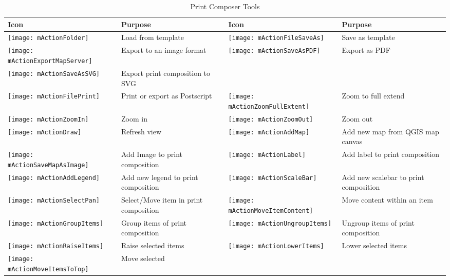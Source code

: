\begin{table}[h]
\centering
\caption{Print Composer Tools}\label{tab:printcomposer_tools}\medskip
 \begin{tabular}{|l|p{6.9cm}|l|p{6.9cm}|}
 \hline \textbf{Icon} & \textbf{Purpose} & \textbf{Icon} &
 \textbf{Purpose} \\
 \hline \texttt{[image: mActionFolder]}
 & Load from template &
 \texttt{[image: mActionFileSaveAs]} & Save as template \\
 \hline \texttt{[image: mActionExportMapServer]}
 & Export to an image format &
 \texttt{[image: mActionSaveAsPDF]} & Export as PDF \\
 \hline \texttt{[image: mActionSaveAsSVG]} & Export print
 composition to SVG & & \\
 \hline \texttt{[image: mActionFilePrint]} & Print or 
 export as Postscript &
 \texttt{[image: mActionZoomFullExtent]} & Zoom to
 full extend \\
 \hline \texttt{[image: mActionZoomIn]} & Zoom in &
 \texttt{[image: mActionZoomOut]} & Zoom out \\
 \hline \texttt{[image: mActionDraw]} & Refresh 
 view &
 \texttt{[image: mActionAddMap]} & Add 
 new map from QGIS map canvas \\
 \hline \texttt{[image: mActionSaveMapAsImage]} & Add Image to 
 print composition &
 \texttt{[image: mActionLabel]} & Add label to print composition \\
 \hline \texttt{[image: mActionAddLegend]} & Add new legend to 
 print composition & 
 \texttt{[image: mActionScaleBar]} & Add new scalebar to print
 composition\\
 \hline \texttt{[image: mActionSelectPan]} & Select/Move item in 
 print composition &
 \texttt{[image: mActionMoveItemContent]} & Move content within
 an item \\
 \hline \texttt{[image: mActionGroupItems]} & Group items of 
 print composition & 
 \texttt{[image: mActionUngroupItems]} & Ungroup items of print 
 composition \\
 \hline \texttt{[image: mActionRaiseItems]} & Raise selected
 items  &
 \texttt{[image: mActionLowerItems]} & Lower selected items \\
 \hline \texttt{[image: mActionMoveItemsToTop]} & Move selected

\end{tabular}
\end{table}
